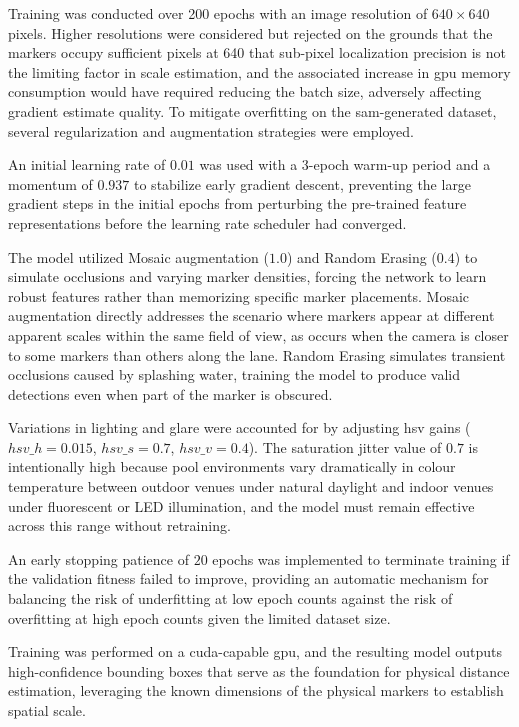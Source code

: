 Training was conducted over 200 epochs with an image resolution of $640 \times 640$ pixels.
Higher resolutions were considered but rejected on the grounds that the markers occupy
sufficient pixels at 640 that sub-pixel localization precision is not the limiting factor in
scale estimation, and the associated increase in \gls{gpu} memory consumption would have required
reducing the batch size, adversely affecting gradient estimate quality. To mitigate overfitting
on the \gls{sam}-generated dataset, several regularization and augmentation strategies were
employed.

An initial learning rate of $0.01$ was used with a 3-epoch warm-up period and a momentum of
$0.937$ to stabilize early gradient descent, preventing the large gradient steps in the
initial epochs from perturbing the pre-trained feature representations before the learning
rate scheduler had converged. 

The model utilized Mosaic augmentation ($1.0$) and Random
Erasing ($0.4$) to simulate occlusions and varying marker densities, forcing the network to
learn robust features rather than memorizing specific marker placements. Mosaic augmentation
directly addresses the scenario where markers appear at different apparent scales within the
same field of view, as occurs when the camera is closer to some markers than others along the
lane. Random Erasing simulates transient occlusions caused by splashing water, training the
model to produce valid detections even when part of the marker is obscured. 

Variations in
lighting and glare were accounted for by adjusting \gls{hsv} gains
($hsv\_h=0.015$, $hsv\_s=0.7$, $hsv\_v=0.4$). The saturation jitter value of $0.7$ is
intentionally high because pool environments vary dramatically in colour temperature between
outdoor venues under natural daylight and indoor venues under fluorescent or LED illumination,
and the model must remain effective across this range without retraining. 

An early stopping patience of $20$ epochs was implemented to terminate training if the validation fitness failed to
improve, providing an automatic mechanism for balancing the risk of underfitting at low epoch
counts against the risk of overfitting at high epoch counts given the limited dataset size.

Training was performed on a \gls{cuda}-capable \gls{gpu}, and the resulting model outputs high-confidence
bounding boxes that serve as the foundation for physical distance estimation, leveraging the
known dimensions of the physical markers to establish spatial scale.

